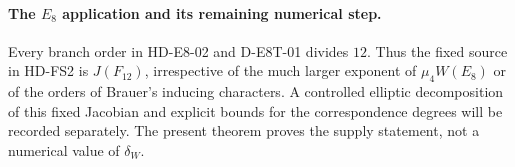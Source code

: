 \paragraph{The $E_8$ application and its remaining numerical step.}
Every branch order in HD-E8-02 and D-E8T-01 divides $12$.
Thus the fixed source in HD-FS2 is $J(F_{12})$, irrespective of
the much larger exponent of $\mu_4W(E_8)$ or of the orders of
Brauer's inducing characters.  A controlled elliptic decomposition
of this fixed Jacobian and explicit bounds for the correspondence
degrees will be recorded separately.  The present theorem proves
the supply statement, not a numerical value of $\delta_W$.
